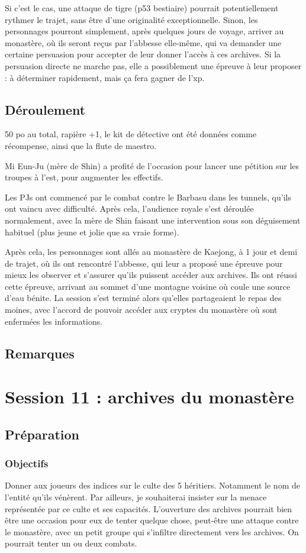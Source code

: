\documentclass[10pt,a4paper]{book}
\begin{document}
Si c'est le cas, une attaque de tigre (p53 bestiaire) pourrait potentiellement rythmer le trajet, sans être d'une originalité exceptionnelle. Sinon, les personnages pourront simplement, après quelques jours de voyage, arriver au monastère, où ils seront reçus par l'abbesse elle-même, qui va demander une certaine persuasion pour accepter de leur donner l'accès à ces archives. Si la persuasion directe ne marche pas, elle a possiblement une épreuve à leur proposer : à déterminer rapidement, mais ça fera gagner de l'xp.

\subsection{Déroulement}
50 po au total, rapière +1, le kit de détective ont été données comme récompense, ainsi que la flute de maestro.

Mi Eun-Ju (mère de Shin) a profité de l'occasion pour lancer une pétition sur les troupes à l'est, pour augmenter les effectifs.

Les PJs ont commencé par le combat contre le Barbasu dans les tunnels, qu'ils ont vaincu avec difficulté. Après cela, l'audience royale s'est déroulée normalement, avec la mère de Shin faisant une intervention sous son déguisement habituel (plus jeune et jolie que sa vraie forme).

Après cela, les personnages sont allés au monastère de Kaejong, à 1 jour et demi de trajet, où ils ont rencontré l'abbesse, qui leur a proposé une épreuve pour mieux les observer et s'assurer qu'ils puissent accéder aux archives. Ils ont réussi cette épreuve, arrivant au sommet d'une montagne voisine où coule une source d'eau bénite. La session s'est terminé alors qu'elles partageaient le repas des moines, avec l'accord de pouvoir accéder aux cryptes du monastère où sont enfermées les informations.
\subsection{Remarques}
\section{Session 11 : archives du monastère}
\subsection{Préparation}
\subsubsection{Objectifs}
Donner aux joueurs des indices sur le culte des 5 héritiers. Notamment le nom de l'entité qu'ils vénèrent. Par ailleurs, je souhaiterai insister sur la menace représentée par ce culte et ses capacités. L'ouverture des archives pourrait bien être une occasion pour eux de tenter quelque chose, peut-être une attaque contre le monastère, avec un petit groupe qui s'infiltre directement vers les archives. On pourrait tenter un ou deux combats.
\end{document}
